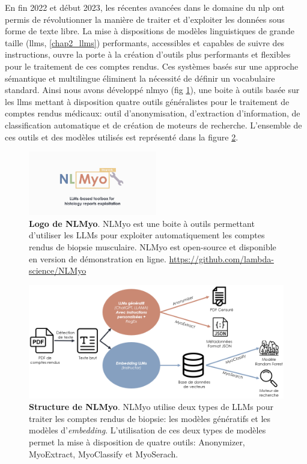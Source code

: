 En fin 2022 et début 2023, les récentes avancées dans le domaine du \gls{nlp} ont permis de révolutionner la manière de traiter et d'exploiter les données sous forme de texte libre. La mise à dispositions de modèles linguistiques de grande taille (\gls{llms}, \ref{chap2_llms}) performants, accessibles et capables de suivre des instructions, ouvre la porte à la création d'outils plus performants et flexibles pour le traitement de ces comptes rendus. Ces systèmes basés sur une approche sémantique et multilingue éliminent la nécessité de définir un vocabulaire standard. Ainsi nous avons développé \gls{nlmyo} (fig \ref{fig:nlmyo_logo}), une boite à outils basée sur les \gls{llms} mettant à disposition quatre outils généralistes pour le traitement de comptes rendus médicaux: outil d'anonymisation, d'extraction d'information, de classification automatique et de création de moteurs de recherche. L'ensemble de ces outils et des modèles utilisés est représenté dans la figure \ref{fig:nlmyo_struct}.
\begin{figure}[!ht]
 \centering
 \includegraphics[width=0.5\textwidth]{figures/nlmyo_banner.png}
 \caption[Logo NLMyo]{\textbf{Logo de NLMyo}. NLMyo est une boite à outils permettant d'utiliser les LLMs pour exploiter automatiquement les comptes rendus de biopsie musculaire. NLMyo est open-source et disponible en version de démonstration en ligne. \url{https://github.com/lambda-science/NLMyo}}
 \label{fig:nlmyo_logo}
\end{figure}
\begin{figure}[!ht]
 \centering
 \includegraphics[width=1\textwidth]{figures/nlmyo_struct.png}
 \caption[Structure de NLMyo]{\textbf{Structure de NLMyo}. NLMyo utilise deux types de LLMs pour traiter les comptes rendus de biopsie: les modèles génératifs et les modèles d'\textit{embedding}. L'utilisation de ces deux types de modèles permet la mise à disposition de quatre outils: Anonymizer, MyoExtract, MyoClassify et MyoSerach.}
 \label{fig:nlmyo_struct}
\end{figure}
